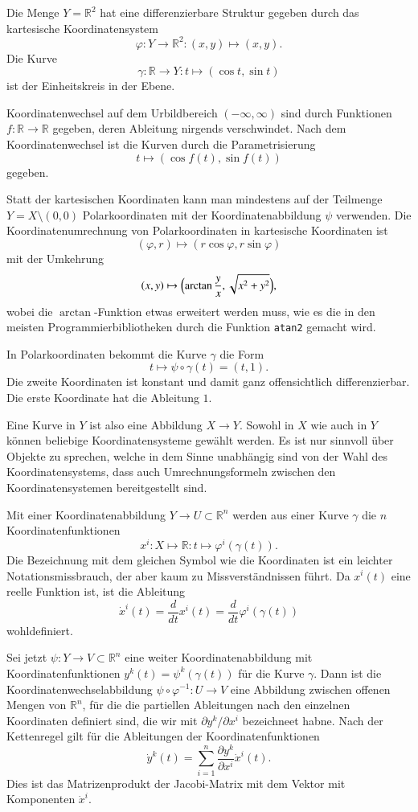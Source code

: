 \begin{beispiel}
Die Menge $Y=\mathbb{R}^2$ hat eine differenzierbare Struktur gegeben durch
das kartesische Koordinatensystem
\[
\varphi
\colon
Y\to\mathbb{R}^2
:
(x,y)\mapsto (x,y).
\]
Die Kurve 
\[
\gamma
\colon
\mathbb{R}\to Y
:
t\mapsto (\cos t, \sin t)
\]
ist der Einheitskreis in der Ebene.

Koordinatenwechsel auf dem Urbildbereich $(-\infty,\infty)$ sind durch
Funktionen $f\colon\mathbb{R}\to\mathbb{R}$ gegeben, deren Ableitung
nirgends verschwindet.
Nach dem Koordinatenwechsel ist die Kurven durch die Parametrisierung
\[
t \mapsto (\cos f(t),\sin f(t))
\]
gegeben.

Statt der kartesischen Koordinaten kann man mindestens auf der Teilmenge
$Y=X\setminus (0,0)$ Polarkoordinaten mit der Koordinatenabbildung $\psi$
verwenden.
Die Koordinatenumrechnung von Polarkoordinaten in kartesische Koordinaten
ist
\[
(\varphi, r) \mapsto (r\cos\varphi,r\sin\varphi)
\]
mit der Umkehrung
\[
(x,y) \mapsto \Bigl(\arctan\frac{y}{x},\sqrt{x^2+y^2}\Bigr),
\]
wobei die $\arctan$-Funktion etwas erweitert werden muss, wie es die
in den meisten Programmierbibliotheken durch die Funktion \texttt{atan2}
gemacht wird.

In Polarkoordinaten bekommt die Kurve $\gamma$ die Form
\[
t\mapsto \psi\circ\gamma(t)
=
(t, 1).
\]
Die zweite Koordinaten ist konstant und damit ganz offensichtlich 
differenzierbar.
Die erste Koordinate hat die Ableitung $1$.
\end{beispiel}

Eine Kurve in $Y$ ist also eine Abbildung $X\to Y$.
Sowohl in $X$ wie auch in $Y$ können beliebige Koordinatensysteme
gewählt werden.
Es ist nur sinnvoll über Objekte zu sprechen, welche in dem
Sinne unabhängig sind von der Wahl des Koordinatensystems, dass
auch Umrechnungsformeln zwischen den Koordinatensystemen bereitgestellt
sind.

Mit einer Koordinatenabbildung $Y\to U\subset\mathbb{R}^n$ werden aus
einer Kurve $\gamma$ die $n$ Koordinatenfunktionen
\[
x^i
\colon
X\mapsto \mathbb{R}
:
t\mapsto \varphi^i(\gamma(t)).
\]
Die Bezeichnung mit dem gleichen Symbol wie die Koordinaten ist ein
leichter Notationsmissbrauch, der aber kaum zu Missverständnissen
führt.
Da $x^i(t)$ eine reelle Funktion ist, ist die Ableitung
\[
\dot{x}^i(t)
=
\frac{d}{dt}x^i(t)
=
\frac{d}{dt}\varphi^i(\gamma(t))
\]
wohldefiniert.

Sei jetzt $\psi\colon Y\to V\subset \mathbb{R}^n$ eine weiter
Koordinatenabbildung mit Koordinatenfunktionen $y^k(t)=\psi^k(\gamma(t))$ 
für die Kurve $\gamma$.
Dann ist die Koordinatenwechselabbildung
$\psi\circ\varphi^{-1}\colon U\to V$ 
eine Abbildung zwischen offenen Mengen von $\mathbb{R}^n$, für die
die partiellen Ableitungen nach den einzelnen Koordinaten definiert sind,
die wir mit $\partial y^k/\partial x^i$ bezeichneet habne.
Nach der Kettenregel gilt für die Ableitungen der Koordinatenfunktionen
\[
\dot{y}^k(t)
=
\sum_{i=1}^n \frac{\partial y^k}{\partial x^i}\dot{x}^i(t).
\]
Dies ist das Matrizenprodukt der Jacobi-Matrix mit dem Vektor mit 
Komponenten $\dot{x}^i$.


